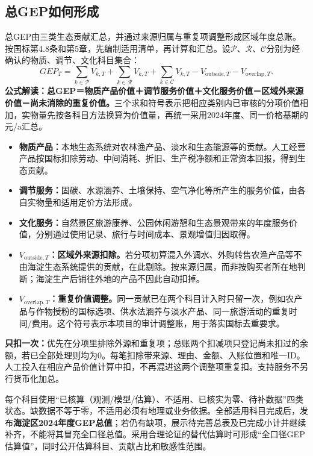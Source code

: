\documentclass[12pt,a4paper,fontset=fandol]{ctexart}
\begin{document}
\subsection{总GEP如何形成}
总GEP由三类生态贡献汇总，并通过来源归属与重复项调整形成区域年度总账。按国标第4.8条和第5章，先编制适用清单，再计算和汇总。设$\mathcal{P}$、$\mathcal{R}$、$\mathcal{C}$分别为经确认的物质、调节、文化科目集合：
\begin{equation}
 GEP_T=\sum_{k\in\mathcal{P}}V_{k,T}+\sum_{k\in\mathcal{R}}V_{k,T}
       +\sum_{k\in\mathcal{C}}V_{k,T}-V_{\mathrm{outside},T}-V_{\mathrm{overlap},T}.
\end{equation}
\textbf{公式解读：总GEP＝物质产品价值＋调节服务价值＋文化服务价值－区域外来源价值－尚未消除的重复价值。}三个求和符号表示把相应类别内已审核的分项价值相加，实物量先按各科目方法换算为价值量，再统一采用2024年度、同一价格基期的元/a汇总。
\begin{itemize}
\item \textbf{物质产品：}本地生态系统对农林渔产品、淡水和生态能源等的贡献。人工经营产品按国标扣除劳动、中间消耗、折旧、生产税净额和正常资本回报，得到生态贡献。
\item \textbf{调节服务：}固碳、水源涵养、土壤保持、空气净化等所产生的服务价值，由各自实物量和适用定价方法形成。
\item \textbf{文化服务：}自然景区旅游康养、公园休闲游憩和生态景观带来的年度服务价值，分别通过使用记录、旅行与时间成本、景观增值归因取得。
\item \textbf{$V_{\mathrm{outside},T}$：区域外来源扣除。}若分项初算混入外调水、外购转售农渔产品等不由海淀生态系统提供的贡献，在此剔除。按来源归属，而非按购买者所在地判断；海淀生产后销往外地的产品不因此自动扣掉。
\item \textbf{$V_{\mathrm{overlap},T}$：重复价值调整。}同一贡献已在两个科目计入时只留一次，例如农产品与作物授粉的国标选项、供水法涵养与淡水产品、同一旅游活动的重复时间/费用。这个符号表示本项目的审计调整账，用于落实国标去重要求。
\end{itemize}
\textbf{只扣一次：}优先在分项里排除外源和重复项；总账两个扣减项只登记尚未扣过的余额，若已全部处理则均为0。每笔扣除带来源、理由、金额、入账位置和唯一ID。人工投入在相应产品价值计算中扣，不再混进这两个调整项重复扣。支持服务不另行货币化加总。

每个科目使用“已核算（观测/模型/估算）、不适用、已核实为零、待补数据”四类状态。缺数据不等于零，不适用必须有地理或业务依据。全部适用科目完成后，发布\textbf{海淀区2024年度GEP总值}；若仍有缺项，展示待完善总表及已完成小计并继续补齐，不能将其冒充全口径总值。采用合理论证的替代估算时可形成“全口径GEP估算值”，同时公开估算科目、贡献占比和敏感性范围。
\end{document}
